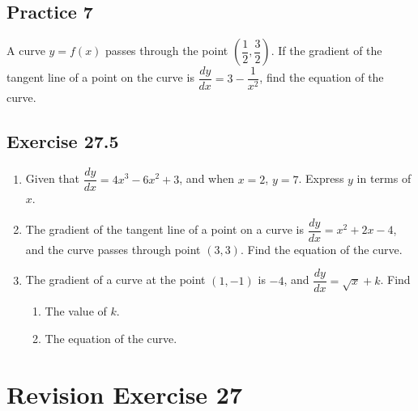\documentclass{report}
\begin{document}
\subsection{Practice 7}
A curve $y = f(x)$ passes through the point $\left(\dfrac{1}{2},
    \dfrac{3}{2}\right)$. If the gradient of the tangent line of a point on the
curve is $\dfrac{dy}{dx} = 3 - \dfrac{1}{x^2}$, find the equation of the curve.

\subsection{Exercise 27.5}

\begin{enumerate}
    \item Given that $\dfrac{dy}{dx} = 4x^3 - 6x^2 + 3$, and when $x = 2$, $y = 7$.
          Express $y$ in terms of $x$.
    \item The gradient of the tangent line of a point on a curve is $\dfrac{dy}{dx} = x^2
              + 2x - 4$, and the curve passes through point $(3, 3)$. Find the equation of
          the curve.
    \item The gradient of a curve at the point $(1, -1)$ is $-4$, and $\dfrac{dy}{dx} =
              \sqrt{x} + k$. Find
          \begin{enumerate}
              \item The value of $k$.
              \item The equation of the curve.
          \end{enumerate}
\end{enumerate}

\newpage
\section*{Revision Exercise 27}
\end{document}
